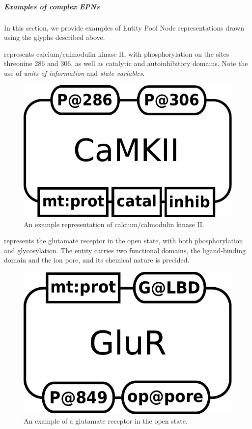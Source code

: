 \subparagraph{Examples of complex EPNs}
\label{sec:CplxEPNs}

In this section, we provide examples of Entity Pool Node representations drawn using the \SBGNPDLone glyphs described above. 

 represents calcium/calmodulin kinase II, with phosphorylation on the sites threonine 286 and 306, as well as catalytic and autoinhibitory domains.  Note the use of \emph{units of information} and \emph{state variables}.

\begin{figure}[H]
  \centering
  \includegraphics[scale = 0.3]{examples/macromolecule-CaMKII}
  \caption{An example representation of calcium/calmodulin kinase II.}
  \label{fig:example-camkii}
\end{figure}

 represents the glutamate receptor in the open state, with both phosphorylation and glycosylation.  The entity carries two functional domains, the ligand-binding domain and the ion pore, and its chemical nature is precided.

\begin{figure}[H]
  \centering
  \includegraphics[scale = 0.3]{examples/macromolecule-GluR}
  \caption{An example of a glutamate receptor in the open state.}
  \label{fig:example-glur}
\end{figure}


